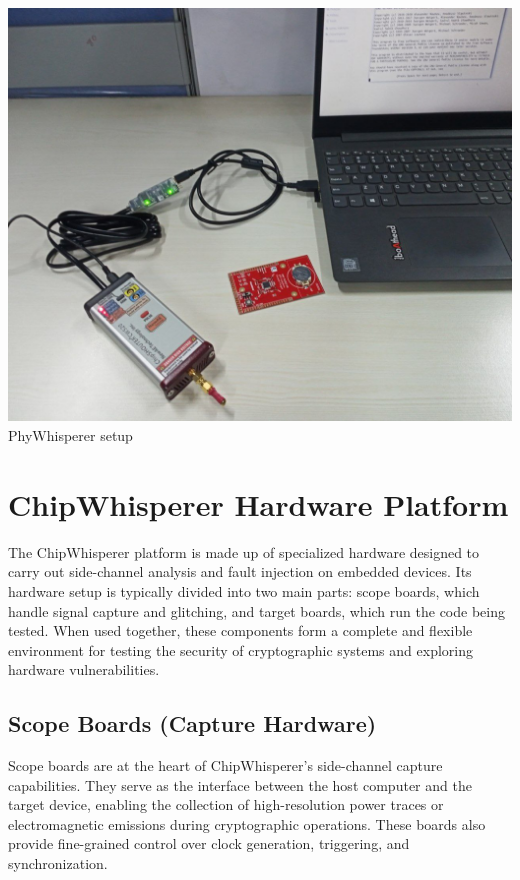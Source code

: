   \begin{minipage}[b]{0.3\linewidth}
    \centering
    \includegraphics[width=\linewidth]{images/phy_hardware.png}
    \smallskip
    PhyWhisperer setup
  \end{minipage}
\section{ChipWhisperer Hardware Platform}
The ChipWhisperer platform is made up of specialized hardware designed to carry out side-channel analysis and fault injection on embedded devices. Its hardware setup is typically divided into two main parts: scope boards, which handle signal capture and glitching, and target boards, which run the code being tested. When used together, these components form a complete and flexible environment for testing the security of cryptographic systems and exploring hardware vulnerabilities.
\subsection{Scope Boards (Capture Hardware)}
Scope boards are at the heart of ChipWhisperer's side-channel capture capabilities. They serve as the interface between the host computer and the target device, enabling the collection of high-resolution power traces or electromagnetic emissions during cryptographic operations. These boards also provide fine-grained control over clock generation, triggering, and synchronization.

